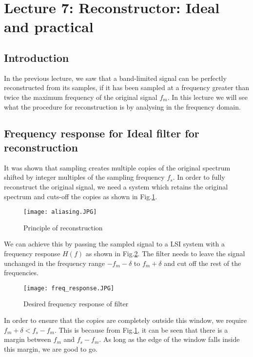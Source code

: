 \section{Lecture 7: Reconstructor: Ideal and practical}


\subsection{Introduction}
In the previous lecture, we saw that a band-limited signal can be perfectly reconstructed from its samples, if it has been sampled at a frequency greater than twice the maximum frequency of the original signal $f_{m}$. In this lecture we will see what the procedure for reconstruction is by analysing in the frequency domain. 


\subsection{Frequency response for Ideal filter for reconstruction}
It was shown that sampling creates multiple copies of the original spectrum shifted by integer multiples of the sampling frequency $f_{s}$. In order to fully reconstruct the original signal, we need a system which retains the original spectrum and cuts-off the copies as shown in Fig.\ref{copies}. 
\begin{figure}[h] 
        \centering
        
                \texttt{[image: aliasing.JPG]}
                \caption{Principle of reconstruction}
                \label{copies}
        
\end{figure}

We can achieve this by passing the sampled signal to a LSI system with a frequency response $H(f)$ as shown in Fig.\ref{freq_response}. The filter needs to leave the signal unchanged in the frequency range $-f_{m} - \delta$ to $f_{m} + \delta$ and cut off the rest of the frequencies. 
\begin{figure}[h] 
        \centering
        
                \texttt{[image: freq\_response.JPG]}
                \caption{Desired frequency response of filter}
                \label{freq_response}
        
\end{figure}
In order to ensure that the copies are completely outside this window, we require $f_{m} + \delta < f_{s} - f_{m}$. This is because from Fig.\ref{copies}, it can be seen that there is a margin between $f_{m}$ and $f_{s} - f_{m}$. As long as the edge of the window falls inside this margin, we are good to go. 


